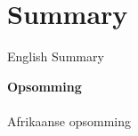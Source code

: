 \chapter*{Summary}
English Summary

\vspace{1 cm} 
\noindent
{\Huge \bf Opsomming} \\
\vspace{1 cm} \\
Afrikaanse opsomming